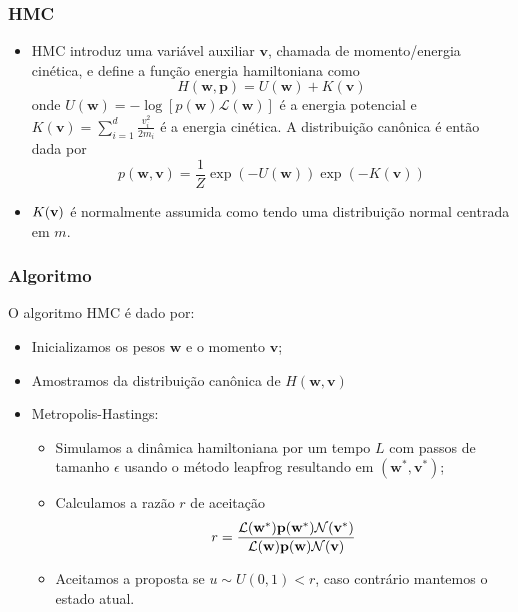 \documentclass{beamer}
\begin{document}
\begin{frame}
    \frametitle{HMC}

    \begin{itemize}
        \item HMC introduz uma variável auxiliar $\mathbf{v}$, chamada de momento/energia cinética, e define a função energia hamiltoniana como
        $$ H(\mathbf{w}, \mathbf{p}) = U(\mathbf{w}) + K(\mathbf{v}) $$
        onde $U(\mathbf{w}) = -\log \left[ p(\mathbf{w}) \mathcal{L}(\mathbf{w}) \right]$ é a energia potencial e $K(\mathbf{v}) = \sum_{i=1}^{d}\frac{v_i^2}{2m_i}$ é a energia cinética. A distribuição canônica é então dada por
        $$ p(\mathbf{w}, \mathbf{v}) = \frac{1}{Z} \exp (-U(\mathbf{w})) \exp (-K(\mathbf{v})) $$
        \item $K(\bf{v})$ é normalmente assumida como tendo uma distribuição normal centrada em $m$.
    \end{itemize}

\end{frame}


\begin{frame}
    \frametitle{Algoritmo}

    O algoritmo HMC é dado por:
    \begin{itemize}
        \item Inicializamos os pesos $\mathbf{w}$ e o momento $\mathbf{v}$;
        \item Amostramos da distribuição canônica de $H(\mathbf{w}, \mathbf{v})$
        \item Metropolis-Hastings:
        \begin{itemize}
            \item Simulamos a dinâmica hamiltoniana por um tempo $L$ com passos de tamanho $\epsilon$ usando o método leapfrog resultando em $(\mathbf{w}^*, \mathbf{v}^*)$;
            \item Calculamos a razão $r$ de aceitação
            $$ r = \frac{\mathcal{L}(\bf{w}^*) p(\bf{w}^*) \mathcal{N}(\bf{v}^*)}{\mathcal{L}(\bf{w}) p(\bf{w}) \mathcal{N}(\bf{v})} $$
            \item Aceitamos a proposta se $u \sim U(0,1) < r$, caso contrário mantemos o estado atual.
        \end{itemize}
    \end{itemize}

\end{frame}
\end{document}
